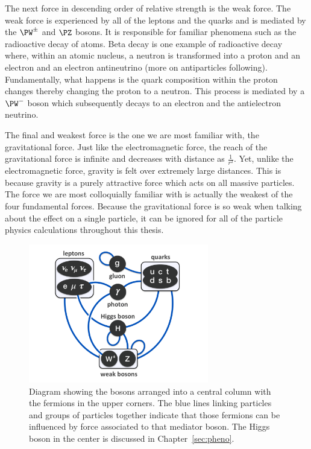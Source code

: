 The next force in descending order of relative strength is the weak force.
The weak force is experienced by
all of the leptons and the quarks and is mediated by the $\PW^{\pm}$ and $\PZ$ 
bosons. It is responsible for familiar phenomena such as the radioactive decay of atoms. 
Beta decay is one example of radioactive decay where, within an atomic nucleus,
a neutron is transformed into a proton and an electron and an electron antineutrino
(more on antiparticles following). Fundamentally, what happens
is the quark composition within the proton changes thereby changing the proton to a
neutron. This process is mediated by a $\PW^{-}$ boson which subsequently decays
to an electron and the antielectron neutrino.

The final and weakest force is the one we are most familiar with, the gravitational
force. Just like the electromagnetic force, the reach of the gravitational force 
is infinite and decreases with distance as $\frac{1}{r^{2}}$. Yet, unlike the
electromagnetic force, gravity is felt over extremely large distances. This is because
gravity is a purely attractive force which acts on all massive particles.
The force we are most colloquially familiar with is actually the
weakest of the four fundamental forces. Because the gravitational force is so weak
when talking about the effect on a single particle, it can be ignored for
all of the particle physics calculations throughout this thesis.

\begin{figure}[htbp]
\centering
     \includegraphics[width=0.7\textwidth]{introduction/plots/elementary_particle_interactions_SM.pdf}
     \caption{
Diagram showing the bosons arranged into a central column with the fermions in the
upper corners. The blue lines linking particles and groups of particles together
indicate that those fermions can be influenced by force associated to that mediator
boson. The Higgs boson in the center is discussed in Chapter~\ref{sec:pheno}.
     }
     \label{fig:sm_forces}
\end{figure}

